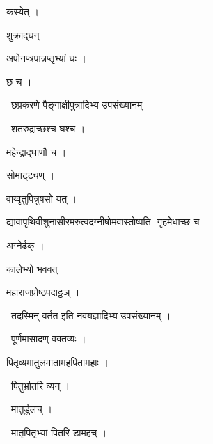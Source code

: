 \documentclass[10pt, openany, oneside]{book}
\begin{document}
\noindent कस्येत् ।

\noindent शुक्राद्घन् ।

\noindent अपोनप्त्रपान्नप्तृभ्यां घः ।

\noindent छ च ।

\par\noindent\hspace{1.5em}{\vps वा॰}~{\qt छप्रकरणे पैङ्गाक्षीपुत्रादिभ्य उपसंख्यानम्  ।}

\par\noindent\hspace{1.5em}{\vps वा॰}~{\qt शतरुद्राच्छश्च घश्च ।}

\noindent महेन्द्राद्घाणौ च ।

\noindent सोमाट्ट्यण् ।

\noindent वाय्वृतुपित्रुषसो यत् ।

\noindent द्यावापृथिवीशुनासीरमरुत्वदग्नीषोमवास्तोष्पति- गृहमेधाच्छ च ।

\noindent अग्नेर्ढक् ।

\noindent कालेभ्यो भववत् ।

\noindent महाराजप्रोष्ठपदाट्ठञ् ।

\par\noindent\hspace{1.5em}{\vps वा॰}~{\qt तदस्मिन् वर्तत इति नवयज्ञादिभ्य उपसंख्यानम् ।}

\par\noindent\hspace{1.5em}{\vps वा॰}~{\qt पूर्णमासादण् वक्तव्यः ।}

\noindent पितृव्यमातुलमातामहपितामहाः ।

\par\noindent\hspace{1.5em}{\vps वा॰}~{\qt पितुर्भ्रातरि व्यन् ।}

\par\noindent\hspace{1.5em}{\vps वा॰}~{\qt मातुर्डुलच् ।}

\par\noindent\hspace{1.5em}{\vps वा॰}~{\qt मातृपितृभ्यां पितरि डामहच् ।}
\end{document}
